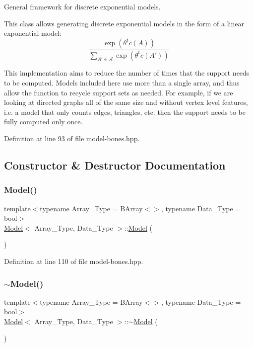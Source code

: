 General framework for discrete exponential models. 

This class allows generating discrete exponential models in the form of a linear exponential model\+: \[ \frac{ \exp{\left(\theta^{\mbox{t}}c(A)\right)} }{ \sum_{A'\in \mathcal{A}}\exp{\left(\theta^{\mbox{t}}c(A')\right)} } \]

This implementation aims to reduce the number of times that the support needs to be computed. Models included here use more than a single array, and thus allow the function to recycle support sets as needed. For example, if we are looking at directed graphs all of the same size and without vertex level features, i.\+e. a model that only counts edges, triangles, etc. then the support needs to be fully computed only once. 

Definition at line 93 of file model-\/bones.\+hpp.



\subsection{Constructor \& Destructor Documentation}
\mbox{\label{class_model_a38122122aa4eb799b90ed1ee49b9410c}} 
\subsubsection{\texorpdfstring{Model()}{Model()}}
{\footnotesize\ttfamily template$<$typename Array\+\_\+\+Type  = B\+Array$<$$>$, typename Data\+\_\+\+Type  = bool$>$ \\
\hyperlink{class_model}{Model}$<$ Array\+\_\+\+Type, Data\+\_\+\+Type $>$\+::\hyperlink{class_model}{Model} (\begin{DoxyParamCaption}{ }\end{DoxyParamCaption})\hspace{0.3cm}{\ttfamily [inline]}}



Definition at line 110 of file model-\/bones.\+hpp.

\mbox{\label{class_model_aaed0a5937479c213e620bf8095ddea5d}} 
\subsubsection{\texorpdfstring{$\sim$\+Model()}{~Model()}}
{\footnotesize\ttfamily template$<$typename Array\+\_\+\+Type  = B\+Array$<$$>$, typename Data\+\_\+\+Type  = bool$>$ \\
\hyperlink{class_model}{Model}$<$ Array\+\_\+\+Type, Data\+\_\+\+Type $>$\+::$\sim$\hyperlink{class_model}{Model} (\begin{DoxyParamCaption}{ }\end{DoxyParamCaption})\hspace{0.3cm}{\ttfamily [inline]}}



